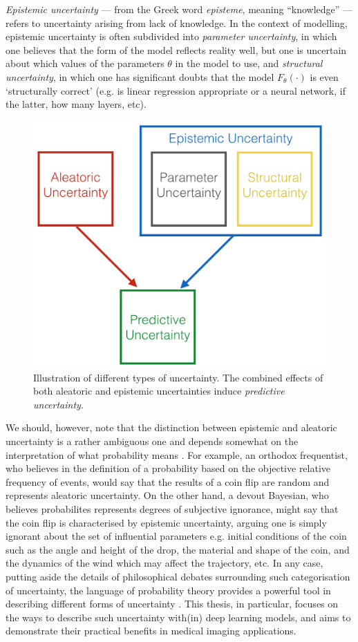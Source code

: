 \textit{Epistemic uncertainty} — from the Greek word \textit{episteme}, meaning “knowledge” — refers to uncertainty arising from lack of knowledge. In the context of modelling, epistemic uncertainty is often subdivided into \textit{parameter uncertainty}, in which one believes that the form of the model reflects reality well, but one is uncertain about which values of the parameters $\theta$ in the model to use, and \textit{structural uncertainty}, in which one has significant doubts that the model $F_{\theta}(\cdot)$ is even ‘structurally correct’ (e.g. is linear regression appropriate or a neural network, if the latter, how many layers, etc).


\begin{figure}[ht]
	\vspace{-2mm}
	\includegraphics[width=0.4\linewidth]{chapter_1/uncertainty_taxonomy.png}
	\centering	
	\vspace{-2mm}
	\caption{\small Illustration of different types of uncertainty. The combined effects of both aleatoric and epistemic uncertainties induce \textit{predictive uncertainty}.  } 
	\label{fig:uncertainty_taxonomy}
\end{figure}

We should, however, note that the distinction between epistemic and aleatoric uncertainty is a rather ambiguous one and depends somewhat on the interpretation of what probability means \cite{cox2006principles,samaniego2010comparison}. For example, an orthodox frequentist, who believes in the definition of a probability based on the objective relative frequency of events, would say that the results of a coin flip are random and represents aleatoric uncertainty.  On the other hand, a devout Bayesian, who believes probabilites represents degrees of subjective ignorance, might say that the coin flip is characterised by epistemic uncertainty, arguing one is simply ignorant about the set of influential parameters e.g. initial conditions of the coin such as the angle and height of the drop, the material and shape of the coin, and the dynamics of the wind which may affect the trajectory, etc. In any case, putting aside the details of philosophical debates surrounding such categorisation of uncertainty, the language of probability theory provides a powerful tool in describing different forms of uncertainty \cite{sullivan2015introduction}. This thesis, in particular, focuses on the ways to describe such uncertainty with(in) deep learning models, and aims to demonstrate their practical benefits in medical imaging applications. 

